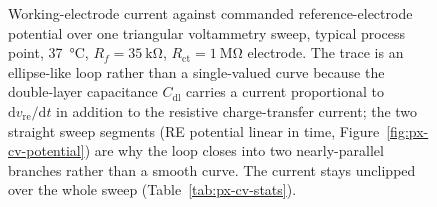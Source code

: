 \providecommand{\MaestroRoot}{include/analog/}
\begin{figure}[htbp]
  \centering
  {\pgfplotsset{compat=1.18}%
  }
  \caption[{CV voltammogram of the pixel system.}]{Working-electrode current against commanded reference-electrode potential over one triangular voltammetry sweep, typical process point, \SI{37}{\celsius}, $R_f = \SI{35}{\kilo\ohm}$, $R_{\mathrm{ct}} = \SI{1}{\mega\ohm}$ electrode. The trace is an ellipse-like loop rather than a single-valued curve because the double-layer capacitance $C_{\mathrm{dl}}$ carries a current proportional to $\mathrm{d}v_{\mathrm{re}}/\mathrm{d}t$ in addition to the resistive charge-transfer current; the two straight sweep segments (RE potential linear in time, Figure~\ref{fig:px-cv-potential}) are why the loop closes into two nearly-parallel branches rather than a smooth curve. The current stays unclipped over the whole sweep (Table~\ref{tab:px-cv-stats}).}
  \label{fig:px-cv-voltammogram}
\end{figure}
